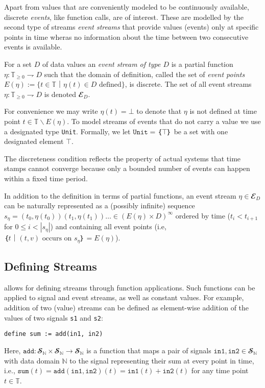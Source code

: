 Apart from values that are conveniently modeled to be continuously available, discrete \emph{events}, like function calls, are of interest.
These are modelled by the second type of streams \emph{event streams} that provide values (events) only at specific points in time wheras no information about the time between two consecutive events is available.

\begin{definition}
  For a set $D$ of data values an \emph{event stream of type $D$} is a partial function $η: 𝕋_{≥0} ⇁ D$ such that the domain of definition, called the set of \emph{event points} $E(η) := \{t∈𝕋｜η(t)∈D \text{ defined}\}$, is discrete.
%
  The set of all event streams $η: 𝕋_{≥0} ⇁D$ is denoted $𝓔_D$.
\end{definition}

For convenience we may write $η(t) = ⊥$ to denote that $η$ is not defined at time point $t∈𝕋∖ E(η)$.
To model streams of events that do not carry a value we use a designated type \texttt{Unit}.
Formally, we let $\mathtt{Unit}=｛⊤｝$ be a set with one designated element $⊤$.

The discreteness condition reflects the property of actual systems that time stamps cannot converge because only a bounded number of events can happen within a fixed time period.

In addition to the definition in terms of partial functions, an event stream $η∈𝓔_D$ can be naturally represented as a (possibly infinite) sequence $s_η=(t_0,η(t_0))(t_1,η(t_1))…∈(E(η)×D)^∞$ ordered by time ($t_i<t_{i+1}$ for $0≤i<|s_η|$) and containing all event points (i.e, $｛t｜(t,v) \text{ occurs on } s_η｝= E(η)$).

\subsection{Defining Streams}

\tessla allows for defining streams through function applications.
Such functions can be applied to signal and event streams, as well as constant values.
For example, addition of two (value) streams can be defined as element-wise addition of the values of two signals \texttt{s1} and \texttt{s2}:
\begin{lstlisting}[language=tessla]
  define sum := add(in1, in2)
\end{lstlisting}
Here, $\mathtt{add}: 𝓢_ℕ × 𝓢_ℕ → 𝓢_ℕ$ is a function that maps a pair of signals $\mathtt{in1},\mathtt{in2}∈𝓢_ℕ$ with data domain $ℕ$ to the signal representing their sum at every point in time, i.e.,  $\mathtt{sum}(t) = \mathtt{add}(\mathtt{in1}, \mathtt{in2})(t) = \mathtt{in1}(t) + \mathtt{in2}(t)$ for any time point $t∈𝕋$.

